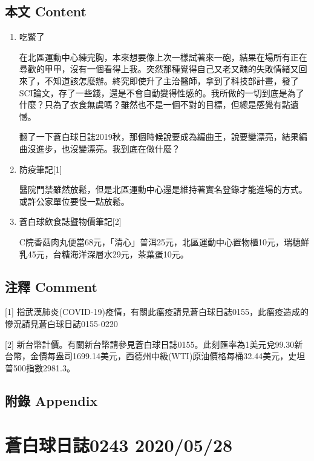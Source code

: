 \documentclass[a5paper, 11pt
]{book}
\begin{document}
\hypertarget{ux672cux6587-content-87}{%
\subsection{本文 Content}\label{ux672cux6587-content-87}}

\begin{enumerate}
\def\labelenumi{\arabic{enumi}.}
\item
  吃鱉了

  在北區運動中心練完胸，本來想要像上次一樣試著來一砲，結果在場所有正在尋歡的甲甲，沒有一個看得上我。突然那種覺得自己又老又醜的失敗情緒又回來了，不知道該怎麼辦。終究即使升了主治醫師，拿到了科技部計畫，發了SCI論文，存了一些錢，還是不會自動變得性感的。我所做的一切到底是為了什麼？只為了衣食無虞嗎？雖然也不是一個不對的目標，但總是感覺有點遺憾。

  翻了一下蒼白球日誌2019秋，那個時候說要成為編曲王，說要變漂亮，結果編曲沒進步，也沒變漂亮。我到底在做什麼？
\item
  防疫筆記{[}1{]}

  醫院門禁雖然放鬆，但是北區運動中心還是維持著實名登錄才能進場的方式。或許公家單位要慢一點放鬆。
\item
  蒼白球飲食誌暨物價筆記{[}2{]}

  C院香菇肉丸便當68元，「清心」普洱25元，北區運動中心置物櫃10元，瑞穗鮮乳45元，台糖海洋深層水29元，茶葉蛋10元。
\end{enumerate}

\hypertarget{ux6ce8ux91cb-comment-87}{%
\subsection{注釋 Comment}\label{ux6ce8ux91cb-comment-87}}

{[}1{]}
指武漢肺炎(COVID-19)疫情，有關此瘟疫請見蒼白球日誌0155，此瘟疫造成的慘況請見蒼白球日誌0155-0220

{[}2{]}
新台幣計價。有關新台幣請參見蒼白球日誌0155。此刻匯率為1美元兌99.30新台幣，金價每盎司1699.14美元，西德州中級(WTI)原油價格每桶32.44美元，史坦普500指數2981.3。

\hypertarget{ux9644ux9304-appendix-87}{%
\subsection{附錄 Appendix}\label{ux9644ux9304-appendix-87}}

\hypertarget{ux84bcux767dux7403ux65e5ux8a8c0243-20200528}{%
\section{蒼白球日誌0243
2020/05/28}\label{ux84bcux767dux7403ux65e5ux8a8c0243-20200528}}
\end{document}
